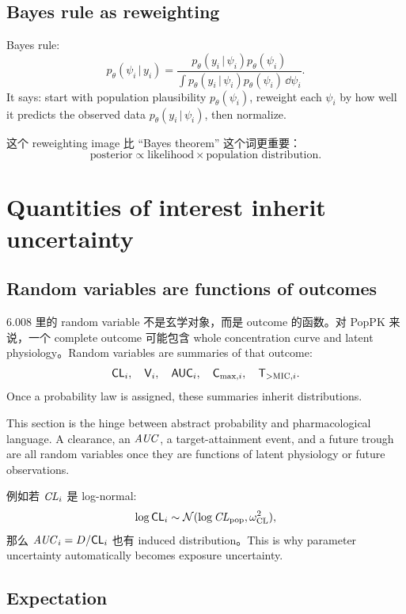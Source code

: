 \documentclass[a4paper]{article}
\newcommand{\rv}[1]{\mathsf{#1}}
\newcommand{\given}{\,|\,}
\newcommand{\Normal}{\mathcal{N}}
\newcommand{\pop}{\mathrm{pop}}
\begin{document}
\subsection{Bayes rule as reweighting}

Bayes rule:
\[
  p_\theta(\psi_i\given y_i)
  =
  \frac{
    p_\theta(y_i\given \psi_i)p_\theta(\psi_i)
  }{
    \int p_\theta(y_i\given \psi_i)p_\theta(\psi_i)\,\dd\psi_i
  }.
\]
It says: start with population plausibility \(p_\theta(\psi_i)\), reweight each \(\psi_i\) by how well it predicts the observed data \(p_\theta(y_i\given\psi_i)\), then normalize.

这个 reweighting image 比 ``Bayes theorem'' 这个词更重要：
\[
  \text{posterior}
  \propto
  \text{likelihood}
  \times
  \text{population distribution}.
\]

\section{Quantities of interest inherit uncertainty}

\subsection{Random variables are functions of outcomes}

6.008 里的 random variable 不是玄学对象，而是 outcome 的函数。对 PopPK 来说，一个 complete outcome 可能包含 whole concentration curve and latent physiology。Random variables are summaries of that outcome:
\[
  \rv{CL}_i,\quad \rv{V}_i,\quad \rv{AUC}_i,\quad
  \rv{C}_{\max,i},\quad \rv{T}_{>\pklab{MIC},i}.
\]
Once a probability law is assigned, these summaries inherit distributions.

This section is the hinge between abstract probability and pharmacological language.  A clearance, an \(\pksym{AUC}\), a target-attainment event, and a future trough are all random variables once they are functions of latent physiology or future observations.

例如若 \(\pksym{CL}_i\) 是 log-normal:
\[
  \log \rv{CL}_i\sim \Normal(\log \pksym{CL}_{\pop},\omega_{\pklab{CL}}^2),
\]
那么 \(\pksym{AUC}_i=D/\rv{CL}_i\) 也有 induced distribution。This is why parameter uncertainty automatically becomes exposure uncertainty.

\subsection{Expectation}
\end{document}
